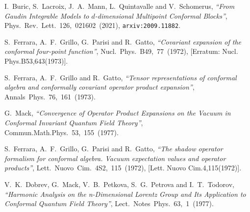 \documentclass{article}
\begin{document}
\begin{thebibliography}{10}
\providecommand{\href}[2]{#2}
\providecommand{\arxivref}[2]{\href{http://arxiv.org/abs/#1}{#2}}
\providecommand{\doiref}[2]{\href{http://dx.doi.org/#1}{#2}}
\providecommand{\nbbstauthor}[1]{#1}
\providecommand{\nbbstjournal}[1]{\textsf{#1}}
\providecommand{\nbbsttitle}[1]{\textit{``#1''}}
\providecommand{\nbbsturl}[1]{\texttt{#1}}
\providecommand{\nbbsteprint}[1]{\texttt{#1}}
\providecommand{\nbbststyle}{\raggedright\small\parskip0pt}
\nbbststyle

\nbbstauthor{I.~Buric, S.~Lacroix, J.~A.~Mann, L.~Quintavalle and
  V.~Schomerus},
\nbbsttitle{{From Gaudin Integrable Models to $d$-dimensional Multipoint
  Conformal Blocks}},
\nbbstjournal{\doiref{10.1103/PhysRevLett.126.021602}{Phys.~Rev.~Lett.~126,~021602~(2021)}},
\nbbsteprint{\arxivref{2009.11882}{arxiv:2009.11882}}.

\nbbstauthor{S.~Ferrara, A.~F.~Grillo, G.~Parisi and R.~Gatto},
\nbbsttitle{{Covariant expansion of the conformal four-point function}},
\nbbstjournal{\doiref{10.1016/0550-3213(72)90587-1,
  10.1016/0550-3213(73)90467-7}{Nucl.~Phys.~B49,~77~(1972)}},
[Erratum: Nucl. Phys.B53,643(1973)].

\nbbstauthor{S.~Ferrara, A.~F.~Grillo and R.~Gatto},
\nbbsttitle{{Tensor representations of conformal algebra and conformally
  covariant operator product expansion}},
\nbbstjournal{\doiref{10.1016/0003-4916(73)90446-6}{Annals~Phys.~76,~161~(1973)}}.

\nbbstauthor{G.~Mack},
\nbbsttitle{{Convergence of Operator Product Expansions on the Vacuum in
  Conformal Invariant Quantum Field Theory}},
\nbbstjournal{\doiref{10.1007/BF01609130}{Commun.Math.Phys.~53,~155~(1977)}}.

\nbbstauthor{S.~Ferrara, A.~F.~Grillo, G.~Parisi and R.~Gatto},
\nbbsttitle{{The shadow operator formalism for conformal algebra. Vacuum
  expectation values and operator products}},
\nbbstjournal{\doiref{10.1007/BF02907130}{Lett.~Nuovo~Cim.~4S2,~115~(1972)}},
[Lett. Nuovo Cim.4,115(1972)].

\nbbstauthor{V.~K.~Dobrev, G.~Mack, V.~B.~Petkova, S.~G.~Petrova and
  I.~T.~Todorov},
\nbbsttitle{{Harmonic Analysis on the n-Dimensional Lorentz Group and Its
  Application to Conformal Quantum Field Theory}},
\nbbstjournal{\doiref{10.1007/BFb0009678}{Lect.~Notes~Phys.~63,~1~(1977)}}.


\end{thebibliography}
\end{document}
